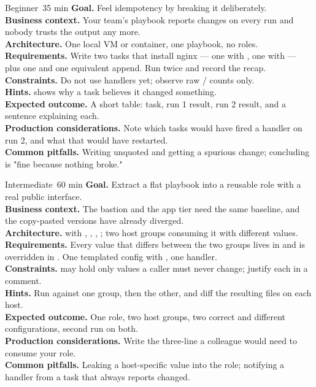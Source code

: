 
\begin{minilab}{Beginner}{~35 min}
\textbf{Goal.} Feel idempotency by breaking it deliberately.\\
\textbf{Business context.} Your team's playbook reports changes on every run and nobody trusts the output any more.\\
\textbf{Architecture.} One local VM or container, one playbook, no roles.\\
\textbf{Requirements.} Write two tasks that install nginx --- one with , one with  --- plus one  and one equivalent  append. Run twice and record the recap.\\
\textbf{Constraints.} Do not use handlers yet; observe raw / counts only.\\
\textbf{Hints.}  shows why a task believes it changed something.\\
\textbf{Expected outcome.} A short table: task, run 1 result, run 2 result, and a sentence explaining each.\\
\textbf{Production considerations.} Note which tasks would have fired a handler on run 2, and what that would have restarted.\\
\textbf{Common pitfalls.} Writing  unquoted and getting a spurious change; concluding  is "fine because nothing broke."
\end{minilab}

\begin{minilab}{Intermediate}{~60 min}
\textbf{Goal.} Extract a flat playbook into a reusable role with a real public interface.\\
\textbf{Business context.} The bastion and the app tier need the same baseline, and the copy-pasted versions have already diverged.\\
\textbf{Architecture.}  with , , , ; two host groups consuming it with different values.\\
\textbf{Requirements.} Every value that differs between the two groups lives in  and is overridden in . One templated config with , one handler.\\
\textbf{Constraints.}  may hold only values a caller must never change; justify each in a comment.\\
\textbf{Hints.} Run against one group, then the other, and diff the resulting files on each host.\\
\textbf{Expected outcome.} One role, two host groups, two correct and different configurations, second run  on both.\\
\textbf{Production considerations.} Write the three-line  a colleague would need to consume your role.\\
\textbf{Common pitfalls.} Leaking a host-specific value into the role; notifying a handler from a task that always reports changed.
\end{minilab}

